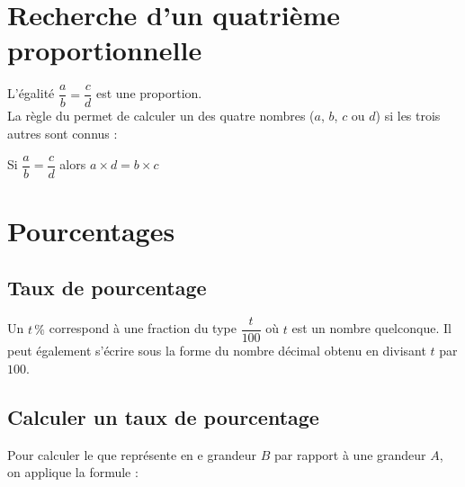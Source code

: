 \documentclass[12pt,a4paper]{article}
\begin{document}


\section{Recherche d'un quatrième proportionnelle}

\begin{mymeth}{}
	L'égalité $\dfrac{a}{b}=\dfrac{c}{d}$ est une proportion.\\
	
	La règle du  permet de calculer un des quatre nombres ($a$, $b$, $c$ ou $d$) si les trois autres sont connus :
	
	\begin{center}
		Si $\dfrac{a}{b} = \dfrac{c}{d}$ alors $a \times d = b \times c$
	\end{center}
\end{mymeth}



\section{Pourcentages}

\subsection{Taux de pourcentage}
\begin{mydef}
	Un  $t\, \% $ correspond à une fraction du type $\dfrac{t}{100}$ où $t$ est un nombre quelconque. Il peut également s'écrire sous la forme du nombre décimal obtenu en divisant $t$ par $100$.
	
\end{mydef}

\subsection{Calculer un taux de pourcentage}
\begin{mymeth}
	Pour calculer le  que représente en e grandeur $B$ par rapport à une grandeur $A$, on applique la formule :
	
	\begin{center}
	\end{center}
	
\end{mymeth}
\end{document}
